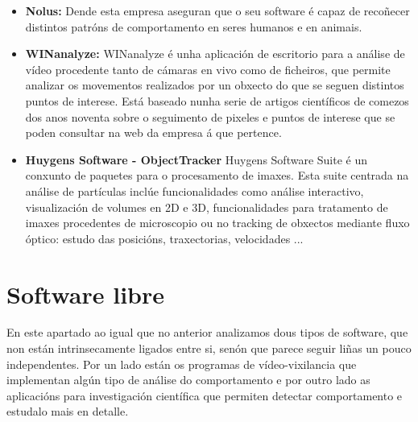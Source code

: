        \begin{itemize}
        \item  \textbf{Nolus:}\cite{nolus-human-behaviour}
            Dende esta empresa aseguran que o seu software é capaz de recoñecer distintos patróns de 
            comportamento en seres humanos e en animais.
        
        \item \textbf{WINanalyze:}\cite{WINanalyze-web-page}
            WINanalyze é unha aplicación de escritorio para a análise de vídeo procedente tanto de 
            cámaras en vivo como de ficheiros, que permite analizar os movementos realizados por un 
            obxecto do que se seguen distintos puntos de interese. Está baseado nunha serie de artigos
            científicos de comezos dos anos noventa sobre o seguimento de pixeles e puntos de interese
            que se poden consultar na web da empresa á que pertence\cite{mikromak-publications}.
        
        \item \textbf{Huygens Software - ObjectTracker}\cite{Huygens-ObjectTracker}
            Huygens Software Suite é un conxunto de paquetes para o procesamento de imaxes.
            Esta suite centrada na análise de partículas inclúe funcionalidades como análise interactivo,
            visualización de volumes en 2D e 3D, funcionalidades para tratamento de imaxes procedentes
            de microscopio ou no tracking de obxectos mediante fluxo óptico: estudo das posicións,
            traxectorias, velocidades ...
            
        \end{itemize}

    \section{Software libre}
    \label{sec:video-vixilancia-libre}
        En este apartado ao igual que no anterior analizamos dous tipos de software, que non están
        intrinsecamente ligados entre si, senón que parece seguir liñas un pouco independentes. Por
        un lado están os programas de vídeo-vixilancia que implementan algún tipo de análise do
        comportamento e por outro lado as aplicacións para investigación científica que permiten 
        detectar comportamento e estudalo mais en detalle.
        
